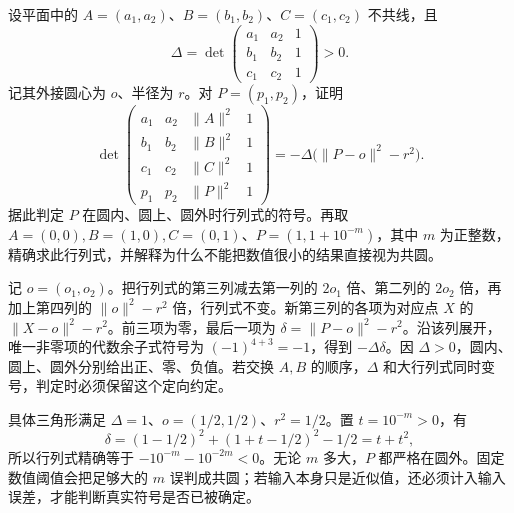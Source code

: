 \begin{exercise}\label{g1:ex:incircle-determinant}
	设平面中的 \(A=(a_1,a_2)\)、\(B=(b_1,b_2)\)、\(C=(c_1,c_2)\) 不共线，且
	\[
		\Delta=\det\begin{pmatrix}a_1&a_2&1\\b_1&b_2&1\\c_1&c_2&1\end{pmatrix}>0.
	\]
	记其外接圆心为 \(o\)、半径为 \(r\)。对 \(P=(p_1,p_2)\)，证明
	\[
		\det\begin{pmatrix}
			a_1&a_2&\lVert A\rVert^2&1\\
			b_1&b_2&\lVert B\rVert^2&1\\
			c_1&c_2&\lVert C\rVert^2&1\\
			p_1&p_2&\lVert P\rVert^2&1
		\end{pmatrix}
		=-\Delta\bigl(\lVert P-o\rVert^2-r^2\bigr).
	\]
	据此判定 \(P\) 在圆内、圆上、圆外时行列式的符号。再取 \(A=(0,0),B=(1,0),C=(0,1)\)、\(P=(1,1+10^{-m})\)，其中 \(m\) 为正整数，精确求此行列式，并解释为什么不能把数值很小的结果直接视为共圆。
\end{exercise}
\begin{solution}
	记 \(o=(o_1,o_2)\)。把行列式的第三列减去第一列的 \(2o_1\) 倍、第二列的 \(2o_2\) 倍，再加上第四列的 \(\lVert o\rVert^2-r^2\) 倍，行列式不变。新第三列的各项为对应点 \(X\) 的 \(\lVert X-o\rVert^2-r^2\)。前三项为零，最后一项为 \(\delta=\lVert P-o\rVert^2-r^2\)。沿该列展开，唯一非零项的代数余子式符号为 \((-1)^{4+3}=-1\)，得到 \(-\Delta\delta\)。因 \(\Delta>0\)，圆内、圆上、圆外分别给出正、零、负值。若交换 \(A,B\) 的顺序，\(\Delta\) 和大行列式同时变号，判定时必须保留这个定向约定。

	具体三角形满足 \(\Delta=1\)、\(o=(1/2,1/2)\)、\(r^2=1/2\)。置 \(t=10^{-m}>0\)，有
	\[
		\delta=(1-1/2)^2+(1+t-1/2)^2-1/2=t+t^2,
	\]
	所以行列式精确等于 \(-10^{-m}-10^{-2m}<0\)。无论 \(m\) 多大，\(P\) 都严格在圆外。固定数值阈值会把足够大的 \(m\) 误判成共圆；若输入本身只是近似值，还必须计入输入误差，才能判断真实符号是否已被确定。
\end{solution}

